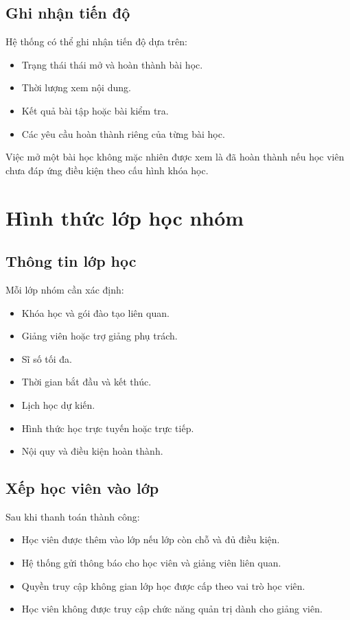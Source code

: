 \documentclass[12pt,a4paper]{article}
\begin{document}
\subsection{Ghi nhận tiến độ}

Hệ thống có thể ghi nhận tiến độ dựa trên:

\begin{itemize}
    \item Trạng thái thái mở và hoàn thành bài học.
    \item Thời lượng xem nội dung.
    \item Kết quả bài tập hoặc bài kiểm tra.
    \item Các yêu cầu hoàn thành riêng của từng bài học.
\end{itemize}

Việc mở một bài học không mặc nhiên được xem là đã hoàn thành
nếu học viên chưa đáp ứng điều kiện theo cấu hình khóa học.

\section{Hình thức lớp học nhóm}

\subsection{Thông tin lớp học}

Mỗi lớp nhóm cần xác định:

\begin{itemize}
    \item Khóa học và gói đào tạo liên quan.
    \item Giảng viên hoặc trợ giảng phụ trách.
    \item Sĩ số tối đa.
    \item Thời gian bắt đầu và kết thúc.
    \item Lịch học dự kiến.
    \item Hình thức học trực tuyến hoặc trực tiếp.
    \item Nội quy và điều kiện hoàn thành.
\end{itemize}

\subsection{Xếp học viên vào lớp}

Sau khi thanh toán thành công:

\begin{itemize}
    \item Học viên được thêm vào lớp nếu lớp còn chỗ và đủ điều kiện.
    \item Hệ thống gửi thông báo cho học viên và giảng viên liên quan.
    \item Quyền truy cập không gian lớp học được cấp theo vai trò học viên.
    \item Học viên không được truy cập chức năng quản trị dành cho giảng viên.
\end{itemize}
\end{document}
